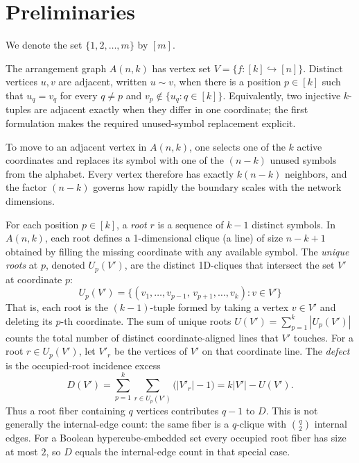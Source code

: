 \section{Preliminaries}\label{sec:preliminaries}

\begin{definition}[Notation]
	We denote the set $\{1, 2, \dots, m\}$ by $[m]$.
\end{definition}

\begin{definition}
The arrangement graph $A(n,k)$ has vertex set $V = \{f:[k]\hookrightarrow[n]\}$.
Distinct vertices $u,v$ are adjacent, written $u\sim v$, when there is a
position $p\in[k]$ such that $u_q=v_q$ for every $q\neq p$ and
$v_p\notin\{u_q:q\in[k]\}$. Equivalently, two injective $k$-tuples are
adjacent exactly when they differ in one coordinate; the first formulation
makes the required unused-symbol replacement explicit.
\end{definition}

To move to an adjacent vertex in $A(n,k)$, one selects one of the $k$ active
coordinates and replaces its symbol with one of the $(n-k)$ unused symbols from
the alphabet. Every vertex therefore has exactly $k(n-k)$ neighbors, and the
factor $(n-k)$ governs how rapidly the boundary scales with the network
dimensions.

\begin{definition}
For each position $p \in [k]$, a \emph{root} $r$ is a sequence of $k-1$ distinct
symbols. In $A(n,k)$, each root defines a 1-dimensional clique (a line) of size
$n-k+1$ obtained by filling the missing coordinate with any available symbol.
The \emph{unique roots} at $p$, denoted $U_p(V')$, are the distinct 1D-cliques
that intersect the set $V'$ at coordinate $p$:
	\begin{equation}\label{eq:unique-roots}
		U_p(V') = \{ (v_1, \ldots, v_{p-1},\, v_{p+1}, \ldots, v_k) : v \in V' \}
	\end{equation}
That is, each root is the $(k{-}1)$-tuple formed by taking a vertex $v \in V'$
and deleting its $p$-th coordinate. The sum of unique roots $U(V') =
\sum_{p=1}^k |U_p(V')|$ counts the total number of distinct coordinate-aligned
lines that $V'$ touches. For a root $r\in U_p(V')$, let $V'_r$ be the
vertices of $V'$ on that coordinate line. The \emph{defect} is the
occupied-root incidence excess
\[
 D(V')=\sum_{p=1}^k\sum_{r\in U_p(V')}\bigl(|V'_r|-1\bigr)
       =k|V'|-U(V').
\]
Thus a root fiber containing $q$ vertices contributes $q-1$ to $D$. This is
not generally the internal-edge count: the same fiber is a $q$-clique with
$\binom q2$ internal edges. For a Boolean hypercube-embedded set every
occupied root fiber has size at most $2$, so $D$ equals the internal-edge count
in that special case.
\end{definition}

